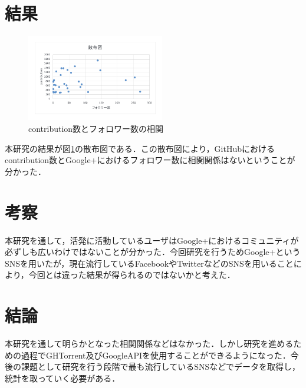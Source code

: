 \documentclass[uplatex,twocolumn,dvipdfmx]{jsarticle}
\begin{document}
\section{結果}

\begin{figure}[thb]
\centering
\includegraphics[width=6cm,clip]{figure.pdf}
\caption{contribution数とフォロワー数の相関}
\label{サンプル図}
\end{figure}

本研究の結果が図\ref{サンプル図}の散布図である．この散布図により，GitHubにおけるcontribution数とGoogle+におけるフォロワー数に相関関係はないということが分かった．

\section{考察}

本研究を通して，活発に活動しているユーザはGoogle+におけるコミュニティが必ずしも広いわけではないことが分かった．今回研究を行うためGoogle+というSNSを用いたが，現在流行しているFacebookやTwitterなどのSNSを用いることにより，今回とは違った結果が得られるのではないかと考えた．

\section{結論}

本研究を通して明らかとなった相関関係などはなかった．しかし研究を進めるための過程でGHTorrent及びGoogleAPIを使用することができるようになった．今後の課題として研究を行う段階で最も流行しているSNSなどでデータを取得し，統計を取っていく必要がある．



\end{document}
